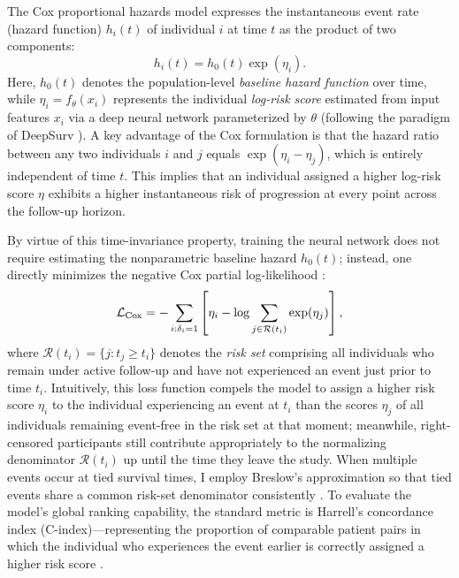 The Cox proportional hazards model \cite{cox1972regression} expresses the instantaneous event rate (hazard function) $h_i(t)$ of individual $i$ at time $t$ as the product of two components:
\begin{equation}
 h_i(t)=h_0(t)\exp(\eta_i).
 \label{eq:cox-hazard}
\end{equation}
Here, $h_0(t)$ denotes the population-level \emph{baseline hazard function} over time, while $\eta_i = f_\theta(x_i)$ represents the individual \emph{log-risk score} estimated from input features $x_i$ via a deep neural network parameterized by $\theta$ (following the paradigm of DeepSurv \cite{katzman2018deepsurv}). A key advantage of the Cox formulation is that the hazard ratio between any two individuals $i$ and $j$ equals $\exp(\eta_i - \eta_j)$, which is entirely independent of time $t$. This implies that an individual assigned a higher log-risk score $\eta$ exhibits a higher instantaneous risk of progression at every point across the follow-up horizon.

By virtue of this time-invariance property, training the neural network does not require estimating the nonparametric baseline hazard $h_0(t)$; instead, one directly minimizes the negative Cox partial log-likelihood \cite{cox1972regression,katzman2018deepsurv}:
\begin{equation}
 \mathcal L_{\rm Cox}=-\sum_{i:\delta_i=1}\left[\eta_i-\log\sum_{j\in\mathcal R(t_i)}\exp(\eta_j)\right],
 \label{eq:cox-loss}
\end{equation}
where $\mathcal R(t_i)=\{j:t_j\geq t_i\}$ denotes the \emph{risk set} comprising all individuals who remain under active follow-up and have not experienced an event just prior to time $t_i$. Intuitively, this loss function compels the model to assign a higher risk score $\eta_i$ to the individual experiencing an event at $t_i$ than the scores $\eta_j$ of all individuals remaining event-free in the risk set at that moment; meanwhile, right-censored participants still contribute appropriately to the normalizing denominator $\mathcal R(t_i)$ up until the time they leave the study. When multiple events occur at tied survival times, I employ Breslow's approximation so that tied events share a common risk-set denominator consistently \cite{breslow1974covariance}. To evaluate the model's global ranking capability, the standard metric is Harrell's concordance index (C-index)---representing the proportion of comparable patient pairs in which the individual who experiences the event earlier is correctly assigned a higher risk score \cite{harrell1996multivariable}.

